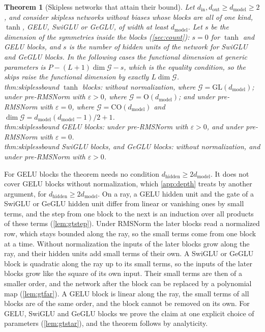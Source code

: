 \documentclass[10pt]{article}
\newtheorem{theorem}{Theorem}[section]
\theoremstyle{definition}
\theoremstyle{remark}
\newcommand{\dm}{d_{\mathrm{model}}}
\newcommand{\dhid}{d_{\mathrm{hidden}}}
\newcommand{\GL}{\mathrm{GL}}
\newcommand{\Ort}{\mathrm{O}}
\newcommand{\CO}{\mathrm{CO}}
\newcommand{\G}{\mathcal{G}}
\newcommand{\ptlabel}[1]{\phantomsection\label{#1}}
\newcommand{\stpart}[3]{\ifx\relax#1\relax\else\ptlabel{#1:#2}\fi{\upshape\bfseries\boldmath(#2)\ifx\relax#3\relax\else\ #3.\fi}}
\begin{document}
\begin{theorem}[Skipless networks that attain their bound]\label{thm:skiplessbound}\label{thm:epszeroskipless}
Let $d_{\mathrm{in}}, d_{\mathrm{out}} \ge \dm \ge 2$, and consider skipless networks without biases whose blocks are all of one kind, $\tanh$, GELU, SwiGLU or GeGLU, of width at least $\dm$. Let $s$ be the dimension of the symmetries inside the blocks (\cref{sec:count}): $s = 0$ for $\tanh$ and GELU blocks, and $s$ is the number of hidden units of the network for SwiGLU and GeGLU blocks. In the following cases the functional dimension at generic parameters is $P - (L+1)\dim\G - s$, which is the equality condition, so the skips raise the functional dimension by exactly $L\dim\G$.\\
\stpart{thm:skiplessbound}{i}{} $\tanh$ blocks: without normalization, where $\G = \GL(\dm)$; under pre-RMSNorm with $\varepsilon > 0$, where $\G = \Ort(\dm)$; and under pre-RMSNorm with $\varepsilon = 0$, where $\G = \CO(\dm)$ and $\dim\G = \dm(\dm-1)/2 + 1$.\\
\stpart{thm:skiplessbound}{ii}{} GELU blocks: under pre-RMSNorm with $\varepsilon > 0$, and under pre-RMSNorm with $\varepsilon = 0$.\\
\stpart{thm:skiplessbound}{iii}{} SwiGLU blocks, and GeGLU blocks: without normalization, and under pre-RMSNorm with $\varepsilon > 0$.
\end{theorem}

For GELU blocks the theorem needs no condition $\dhid \ge 2\dm$. It does not cover GELU blocks without normalization, which \cref{app:depth} treats by another argument, for $\dhid \ge 2\dm$. On a ray, a GELU hidden unit and the gate of a SwiGLU or GeGLU hidden unit differ from linear or vanishing ones by small terms, and the step from one block to the next is an induction over all products of these terms (\cref{lem:gtstep}). Under RMSNorm the later blocks read a normalized row, which stays bounded along the ray, so the small terms come from one block at a time. Without normalization the inputs of the later blocks grow along the ray, and their hidden units add small terms of their own. A SwiGLU or GeGLU block is quadratic along the ray up to its small terms, so the inputs of the later blocks grow like the square of its own input. Their small terms are then of a smaller order, and the network after the block can be replaced by a polynomial map (\cref{lem:gtfar}). A GELU block is linear along the ray, the small terms of all blocks are of the same order, and the block cannot be removed on its own. For GELU, SwiGLU and GeGLU blocks we prove the claim at one explicit choice of parameters (\cref{lem:gtstar}), and the theorem follows by analyticity.
\end{document}
